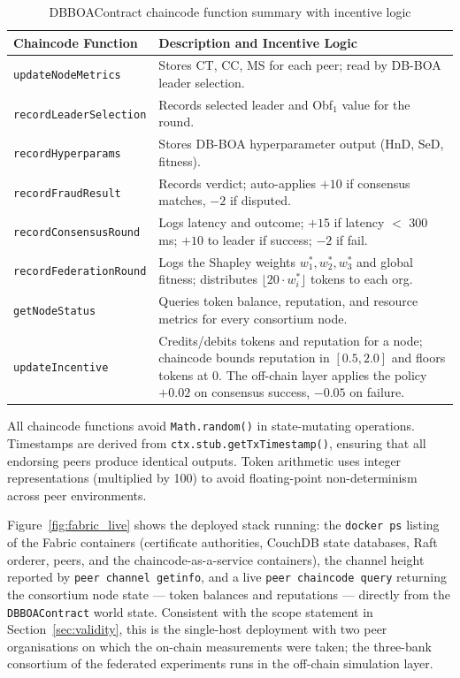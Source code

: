 \begin{table}[H]
\centering
\caption{DBBOAContract chaincode function summary with incentive logic}
\label{tab:chaincode_functions}
\begin{tabular}{|p{4.6cm}|p{9.2cm}|}
\hline
\textbf{Chaincode Function} & \textbf{Description and Incentive Logic} \\ \hline
\texttt{updateNodeMetrics} & Stores CT, CC, MS for each peer; read by DB-BOA leader selection. \\ \hline
\texttt{recordLeaderSelection} & Records selected leader and Obf$_1$ value for the round. \\ \hline
\texttt{recordHyperparams} & Stores DB-BOA hyperparameter output (HnD, SeD, fitness). \\ \hline
\texttt{recordFraudResult} & Records verdict; auto-applies $+10$ if consensus matches, $-2$ if disputed. \\ \hline
\texttt{recordConsensusRound} & Logs latency and outcome; $+15$ if latency $<$ 300\,ms; $+10$ to leader if success; $-2$ if fail. \\ \hline
\texttt{recordFederationRound} & Logs the Shapley weights $w_1^\ast, w_2^\ast, w_3^\ast$ and global fitness; distributes $\lfloor 20 \cdot w_i^\ast\rfloor$ tokens to each org. \\ \hline
\texttt{getNodeStatus} & Queries token balance, reputation, and resource metrics for every consortium node. \\ \hline
\texttt{updateIncentive} & Credits/debits tokens and reputation for a node; chaincode bounds reputation in $[0.5, 2.0]$ and floors tokens at 0. The off-chain layer applies the policy $+0.02$ on consensus success, $-0.05$ on failure. \\ \hline
\end{tabular}
\end{table}

All chaincode functions avoid \texttt{Math.random()} in state-mutating operations. Timestamps are derived from \texttt{ctx.stub.getTxTimestamp()}, ensuring that all endorsing peers produce identical outputs. Token arithmetic uses integer representations (multiplied by 100) to avoid floating-point non-determinism across peer environments.

Figure~\ref{fig:fabric_live} shows the deployed stack running: the \texttt{docker ps} listing of the Fabric containers (certificate authorities, CouchDB state databases, Raft orderer, peers, and the chaincode-as-a-service containers), the channel height reported by \texttt{peer channel getinfo}, and a live \texttt{peer chaincode query} returning the consortium node state --- token balances and reputations --- directly from the \texttt{DBBOAContract} world state. Consistent with the scope statement in Section~\ref{sec:validity}, this is the single-host deployment with two peer organisations on which the on-chain measurements were taken; the three-bank consortium of the federated experiments runs in the off-chain simulation layer.


